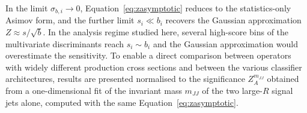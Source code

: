 In the limit $\sigma_{b,i}\to 0$, Equation~\ref{eq:zasymptotic} reduces to the statistics-only Asimov form, and the further limit $s_i\ll b_i$ recovers the Gaussian approximation $Z\approx s/\sqrt{b}$. In the analysis regime studied here, several high-score bins of the multivariate discriminants reach $s_i\sim b_i$ and the Gaussian approximation would overestimate the sensitivity. To enable a direct comparison between operators with widely different production cross sections and between the various classifier architectures, results are presented normalised to the significance $Z_A^{m_{JJ}}$ obtained from a one-dimensional fit of the invariant mass $m_{JJ}$ of the two large-$R$ signal jets alone, computed with the same Equation~\ref{eq:zasymptotic}.